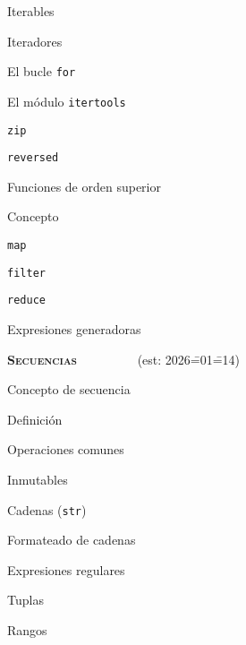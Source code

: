 \begin{longenum}
\begin{longenum}
        \begin{longenum}
            \item Iterables
            \item Iteradores
            \begin{longenum}
                \item El bucle \texttt{for}
                \item El módulo \texttt{itertools}
                \item \texttt{zip}
                \item \texttt{reversed}
            \end{longenum}
        \end{longenum}
        \item Funciones de orden superior
        \begin{longenum}
            \item Concepto
            \item \texttt{map}
            \item \texttt{filter}
            \item \texttt{reduce}
            \item Expresiones generadoras
        \end{longenum}
    \end{longenum}
    \item \textbf{\textsc{Secuencias}} \ \ \ \ \ \ \ \ \ (est: 2026\==01\==14)
    \begin{longenum}
        \item Concepto de secuencia
        \begin{longenum}
            \item Definición
            \item Operaciones comunes
        \end{longenum}
        \item Inmutables
        \begin{longenum}
            \item Cadenas (\texttt{str})
            \begin{longenum}
                \item Formateado de cadenas
                \item Expresiones regulares
            \end{longenum}
            \item Tuplas
            \item Rangos
        \end{longenum}

\end{longenum}
\end{longenum}
